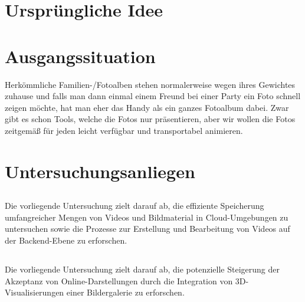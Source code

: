 
\section{Ursprüngliche Idee}

\section{Ausgangssituation}

Herkömmliche Familien-/Fotoalben stehen normalerweise wegen ihres Gewichtes 
zuhause und falls man dann einmal einem Freund bei einer Party ein Foto schnell 
zeigen möchte, hat man eher das Handy als ein ganzes Fotoalbum dabei.
\newline
Zwar gibt es schon Tools, welche die Fotos nur präsentieren, 
aber wir wollen die Fotos zeitgemä\ss{} für jeden leicht verfügbar und transportabel animieren.

\section{Untersuchungsanliegen}

\subsection{\firstauthor}

Die vorliegende Untersuchung zielt darauf ab, die effiziente Speicherung 
umfangreicher Mengen von Videos und Bildmaterial in Cloud-Umgebungen zu 
untersuchen sowie die Prozesse zur Erstellung und Bearbeitung von Videos 
auf der Backend-Ebene zu erforschen.

\subsection{\secondauthor}

Die vorliegende Untersuchung zielt darauf ab, die potenzielle Steigerung 
der Akzeptanz von Online-Darstellungen durch die Integration von 
3D-Visualisierungen einer Bildergalerie zu erforschen.

